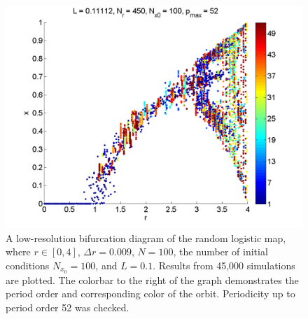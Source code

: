 \begin{figure}[H]\linespread{1}
\caption[Random logistic map bifurcation diagram, low resolution]{A
  low-resolution bifurcation diagram of the random
logistic map, where $r \in [0,4]$, $\Delta r = 0.009$, $N=100$, the
number of initial conditions $N_{x_0}=100$, and $L=0.1$. Results from 45,000 simulations are plotted. The colorbar to the right
of the graph demonstrates the period order and corresponding color of
the orbit. Periodicity up to period order 52 was checked.}
	\begin{center}
          \includegraphics[scale=0.6]{figs/rlog_bif_L_01_low.png}
	\end{center}
\end{figure}


